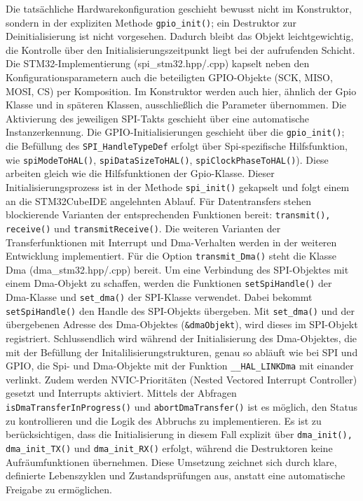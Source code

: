 Die tatsächliche Hardwarekonfiguration geschieht bewusst nicht im Konstruktor, sondern in der expliziten Methode \texttt{gpio\_init()}; ein Destruktor zur Deinitialisierung ist nicht vorgesehen.
Dadurch bleibt das Objekt leichtgewichtig, die Kontrolle über den Initialisierungszeitpunkt liegt bei der aufrufenden Schicht.
\\
Die STM32-Implementierung (spi\_stm32.hpp/.cpp) kapselt neben den Konfigurationsparametern auch die beteiligten GPIO-Objekte (SCK, MISO, MOSI, CS) per Komposition. 
Im Konstruktor werden auch hier, ähnlich der Gpio Klasse und in späteren Klassen, ausschließlich die Parameter übernommen. 
Die Aktivierung des jeweiligen SPI-Takts geschieht über eine automatische Instanzerkennung.
Die GPIO-Initialisierungen geschieht über die \texttt{gpio\_init()}; 
die Befüllung des \texttt{SPI\_HandleTypeDef}  erfolgt über Spi-spezifische Hilfsfunktion, wie \texttt{spiModeToHAL()}, \texttt{spiDataSizeToHAL()}, \texttt{spiClockPhaseToHAL()}). 
Diese arbeiten gleich wie die Hilfsfunktionen der Gpio-Klasse.
Dieser Initialisierungsprozess ist in der Methode \texttt{spi\_init()} gekapselt und folgt einem an die STM32CubeIDE angelehnten Ablauf.
Für Datentransfers stehen blockierende Varianten der entsprechenden Funktionen bereit: \texttt{transmit(), receive()} und \texttt{transmitReceive()}.%
Die weiteren Varianten der Transferfunktionen mit Interrupt und Dma-Verhalten werden in der weiteren Entwicklung implementiert.
Für die Option \texttt{transmit\_Dma()} steht die Klasse Dma (dma\_stm32.hpp/.cpp) bereit.
Um eine Verbindung des SPI-Objektes mit einem Dma-Objekt zu schaffen, werden die Funktionen \texttt{setSpiHandle()} der Dma-Klasse und \texttt{set\_dma()} der SPI-Klasse verwendet.
Dabei bekommt \texttt{setSpiHandle()} den Handle des SPI-Objekts übergeben.
Mit \texttt{set\_dma()} und der übergebenen Adresse des Dma-Objektes (\texttt{\&dmaObjekt}), wird dieses im SPI-Objekt registriert.
Schlussendlich wird während der Initialisierung des Dma-Objektes, die mit der Befüllung der Initalilisierungstrukturen, genau so abläuft wie bei SPI und GPIO, die Spi- und Dma-Objekte mit der Funktion \texttt{\_\_HAL\_LINKDma} mit einander verlinkt.
Zudem werden NVIC-Prioritäten (Nested Vectored Interrupt Controller) gesetzt und Interrupts aktiviert.
Mittels der Abfragen \texttt{isDmaTransferInProgress()} und \texttt{abortDmaTransfer()} ist es möglich, den Status zu kontrollieren und die Logik des Abbruchs zu implementieren.
Es ist zu berücksichtigen, dass die Initialisierung in diesem Fall explizit über \texttt{dma\_init(), dma\_init\_TX()} und \texttt{dma\_init\_RX()} erfolgt, während die Destruktoren keine Aufräumfunktionen übernehmen.
Diese Umsetzung zeichnet sich durch klare, definierte Lebenszyklen und Zustandsprüfungen aus, anstatt eine automatische Freigabe zu ermöglichen.

